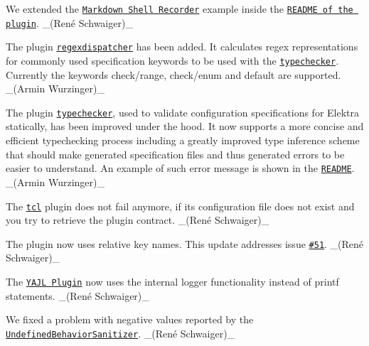 \begin{DoxyItemize}
\item We extended the \href{https://master.libelektra.org/tests/shell/shell_recorder/tutorial_wrapper}{\tt Markdown Shell Recorder} example inside the \href{https://www.libelektra.org/plugins/type}{\tt R\+E\+A\+D\+ME of the plugin}. \+\_\+(René Schwaiger)\+\_\+
\end{DoxyItemize}


\begin{DoxyItemize}
\item The plugin \href{https://www.libelektra.org/plugins/regexdispatcher}{\tt regexdispatcher} has been added. It calculates regex representations for commonly used specification keywords to be used with the \href{https://www.libelektra.org/plugins/typechecker}{\tt typechecker}. Currently the keywords {\ttfamily check/range}, {\ttfamily check/enum} and {\ttfamily default} are supported. \+\_\+(\+Armin Wurzinger)\+\_\+
\end{DoxyItemize}


\begin{DoxyItemize}
\item The plugin \href{https://www.libelektra.org/plugins/typechecker}{\tt typechecker}, used to validate configuration specifications for Elektra statically, has been improved under the hood. It now supports a more concise and efficient typechecking process including a greatly improved type inference scheme that should make generated specification files and thus generated errors to be easier to understand. An example of such error message is shown in the \href{https://www.libelektra.org/plugins/typechecker}{\tt R\+E\+A\+D\+ME}. \+\_\+(\+Armin Wurzinger)\+\_\+
\end{DoxyItemize}


\begin{DoxyItemize}
\item The \href{http://libelektra.org/plugins/tcl}{\tt {\ttfamily tcl}} plugin does not fail anymore, if its configuration file does not exist and you try to retrieve the plugin contract. \+\_\+(René Schwaiger)\+\_\+
\item The plugin now uses relative key names. This update addresses issue \href{https://issues.libelektra.org/51}{\tt \#51}. \+\_\+(René Schwaiger)\+\_\+
\end{DoxyItemize}


\begin{DoxyItemize}
\item The \href{http://libelektra.org/plugins/yajl}{\tt Y\+A\+JL Plugin} now uses the internal logger functionality instead of {\ttfamily printf} statements. \+\_\+(René Schwaiger)\+\_\+
\item We fixed a problem with negative values reported by the \href{https://clang.llvm.org/docs/UndefinedBehaviorSanitizer.html}{\tt Undefined\+Behavior\+Sanitizer}. \+\_\+(René Schwaiger)\+\_\+
\end{DoxyItemize}


